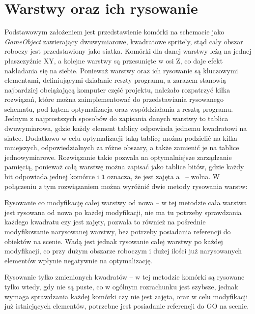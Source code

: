 \section{Warstwy oraz ich rysowanie}
\label{sec:warstwy_oraz_ich_rysowanie}

Podstawowym założeniem jest przedstawienie komórki na schemacie jako \textit{GameObject} zawierający dwuwymiarowe,
kwadratowe sprite'y,
stąd cały obszar roboczy jest przedstawiony jako siatka.
Komórki dla danej warstwy leżą na jednej płaszczyźnie XY, a kolejne warstwy są przesunięte w osi Z,
co daje efekt nakładania się na siebie.
Ponieważ warstwy oraz ich rysowanie są kluczowymi elementami, definiującymi działanie reszty programu,
a zarazem stanowią najbardziej obciążającą komputer część projektu,
należało rozpatrzyć kilka rozwiązań, które można zaimplementować do przedstawiania rysowanego schematu,
pod kątem optymalizacja oraz współdziałania z resztą programu.\\

\indent Jednym z najprostszych sposobów do zapisania danych warstwy to tablica dwuwymiarowa,
gdzie każdy element tablicy odpowiada jednemu kwadratowi na siatce.
Dodatkowo w celu optymalizacji taką tablicę można podzielić na kilka mniejszych,
odpowiedzialnych za różne obszary, a także zamienić je na tablice jednowymiarowe.
Rozwiązanie takie pozwala na optymalniejsze zarządzanie pamięcią,
ponieważ całą warstwę można zapisać jako tablice bitów,
gdzie każdy bit odpowiada jednej komórce i \texttt{1} oznacza,
że jest zajęta a~ -- wolna.
W połączeniu z tym rozwiązaniem można wyróżnić dwie metody rysowania warstw:

\begin{citemize}
    \item Rysowanie co modyfikację całej warstwy od nowa -- w tej metodzie cała warstwa jest rysowana od nowa po każdej modyfikacji,
    nie ma tu potrzeby sprawdzania każdego kwadratu czy jest zajęty, pozwala to również na pośrednie modyfikowanie narysowanej warstwy,
    bez potrzeby posiadania referencji do obiektów na scenie.
    Wadą jest jednak rysowanie całej warstwy po każdej modyfikacji,
    co przy dużym obszarze roboczym i dużej ilości już narysowanych elementów wpłynie negatywnie na optymalizację.
    \item Rysowanie tylko zmienionych kwadratów -- w tej metodzie komórki są rysowane tylko wtedy, gdy nie są puste,
    co w ogólnym rozrachunku jest szybsze, jednak wymaga sprawdzania każdej komórki czy nie jest zajęta,
    oraz w celu modyfikacji już istniejących elementów, potrzebne jest posiadanie referencji do GO na scenie.
\end{citemize}

